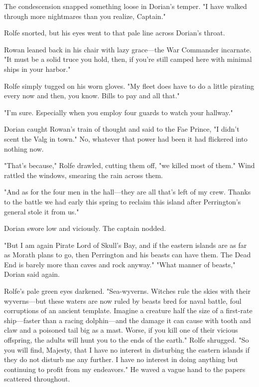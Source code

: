 The condescension snapped something loose in Dorian's temper.
"I have walked through more nightmares than you realize, Captain."

Rolfe snorted, but his eyes went to that pale line across Dorian's throat.

Rowan leaned back in his chair with lazy grace---the War Commander incarnate.
"It must be a solid truce you hold, then, if you're still camped here with minimal ships in your harbor."

Rolfe simply tugged on his worn gloves.
"My fleet does have to do a little pirating every now and then, you know.
Bills to pay and all that."

"I'm sure.
Especially when you employ four guards to watch your hallway."

Dorian caught Rowan's train of thought and said to the Fae Prince, "I didn't scent the Valg in town."
No, whatever that power had been  it had flickered into nothing now.

"That's because," Rolfe drawled, cutting them off, "we killed most of them."
Wind rattled the windows, smearing the rain across them.

"And as for the four men in the hall---they are all that's left of my crew.
Thanks to the battle we had early this spring to reclaim this island after Perrington's general stole it from us."

Dorian swore low and viciously.
The captain nodded.

"But I am again Pirate Lord of Skull's Bay, and if the eastern islands are as far as Morath plans to go, then Perrington and his beasts can have them.
The Dead End is barely more than caves and rock anyway."
"What manner of beasts," Dorian said again.

Rolfe's pale green eyes darkened.
"Sea-wyverns.
Witches rule the skies with their wyverns---but these waters are now ruled by beasts bred for naval battle, foul corruptions of an ancient template.
Imagine a creature half the size of a first-rate ship---faster than a racing dolphin---and the damage it can cause with tooth and claw and a poisoned tail big as a mast.
Worse, if you kill one of their vicious offspring, the adults will hunt you to the ends of the earth."
Rolfe shrugged.
"So you will find, Majesty, that I have no interest in disturbing the eastern islands if they do not disturb me any further.
I have no interest in doing anything but continuing to profit from my endeavors."
He waved a vague hand to the papers scattered throughout.

